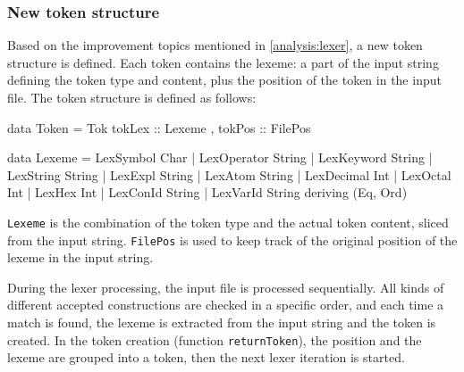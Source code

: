 \subsubsection{New token structure}
Based on the improvement topics mentioned in \autoref{analysis:lexer}, a new token structure is defined.
Each token contains the lexeme: a part of the input string defining the token type and content, plus the position of the token in the input file.
The token structure is defined as follows:

\begin{haskell}
data Token = Tok { tokLex :: Lexeme
                 , tokPos :: FilePos
                 }
                        
data Lexeme  = LexSymbol      Char
             | LexOperator    String
             | LexKeyword     String
             | LexString      String
             | LexExpl        String
             | LexAtom        String
             | LexDecimal     Int
             | LexOctal       Int
             | LexHex         Int
             | LexConId       String
             | LexVarId       String
  deriving (Eq, Ord)
\end{haskell}
%
\texttt{Lexeme} is the combination of the token type and the actual token content, sliced from the input string.
\texttt{FilePos} is used to keep track of the original position of the lexeme in the input string.

During the lexer processing, the input file is processed sequentially.
All kinds of different accepted constructions are checked in a specific order, and each time a match is found, the lexeme is extracted from the input string and the token is created.
In the token creation (function \texttt{returnToken}), the position and the lexeme are grouped into a token, then the next lexer iteration is started.
